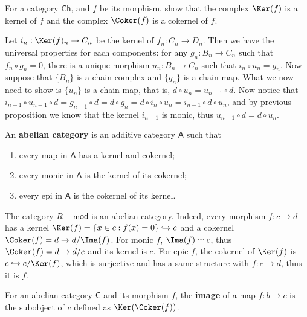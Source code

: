 \begin{exer} For a category $\mathsf{Ch}$, and $f$ be its morphism, show that the complex $\Ker(f)$ is a kernel of $f$ and the complex $\Coker(f)$ is a cokernel of $f$.
\end{exer}
\begin{solution} Let $i_n:\Ker(f)_n\rightarrow C_n$ be the kernel of $f_n:C_n\rightarrow D_n$. Then we have the universal properties for each components: for any $g_n:B_n\rightarrow C_n$ such that $f_n\circ g_n=0$, there is a unique morphism $u_n:B_n\rightarrow C_n$ such that $i_n\circ u_n=g_n$. Now suppose that $\{B_n\}$ is a chain complex and $\{g_n\}$ is a chain map. What we now need to show is $\{u_n\}$ is a chain map, that is, $d\circ u_n=u_{n-1}\circ d$. Now notice that $i_{n-1}\circ u_{n-1}\circ d=g_{n-1}\circ d=d\circ g_n=d\circ i_n\circ u_n=i_{n-1}\circ d\circ u_n$, and by previous proposition we know that the kernel $i_{n-1}$ is monic, thus $u_{n-1}\circ d=d\circ u_n$.
\end{solution}

\begin{defn} An \textbf{abelian category} is an additive category $\mathsf{A}$ such that
\begin{enumerate}
\item every map in $\mathsf{A}$ has a kernel and cokernel;
\item every monic in $\mathsf{A}$ is the kernel of its cokernel;
\item every epi in $\mathsf{A}$ is the cokernel of its kernel.
\end{enumerate}
\end{defn}

\begin{exmp} The category $R-\mathsf{mod}$ is an abelian category. Indeed, every morphism $f:c\rightarrow d$ has a kernel $\Ker(f)=\{x\in c:f(x)=0\}\hookrightarrow c$ and a cokernel $\Coker(f)=d\rightarrow d/\Ima(f)$. For monic $f$, $\Ima(f)\simeq c$, thus $\Coker(f)=d\rightarrow d/c$ and its kernel is $c$. For epic $f$, the cokernel of $\Ker(f)$ is $c\hookrightarrow c/\Ker(f)$, which is surjective and has a same structure with $f:c\rightarrow d$, thus it is $f$.
\end{exmp}

\begin{defn} For an abelian category $\mathsf{C}$ and its morphism $f$, the \textbf{image} of a map $f:b\rightarrow c$ is the subobject of $c$ defined as $\Ker(\Coker(f))$.
\end{defn}

